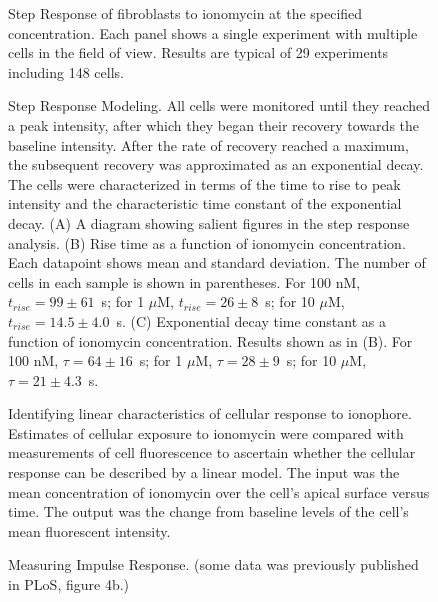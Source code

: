 \documentclass[letterpaper]{article}
\begin{document}
\begin{figure}
\centering

\caption{Step Response of fibroblasts to ionomycin at the specified
  concentration.  Each panel shows a single experiment with multiple cells
  in the field of view.  Results are typical of 29 experiments including
  148 cells. }
\end{figure}


\begin{figure}
\centering


\caption{Step Response Modeling.  All cells were monitored until they
  reached a peak intensity, after which they began their recovery towards
  the baseline intensity.  After the rate of recovery reached a maximum,
  the subsequent recovery was approximated as an exponential decay.  The
  cells were characterized in terms of the time to rise to peak intensity
  and the characteristic time constant of the exponential decay. (A) A
  diagram showing salient figures in the step response analysis.  (B) Rise
  time as a function of ionomycin concentration.  Each datapoint shows mean
  and standard deviation.  The number of cells in each sample is shown in
  parentheses.  For 100 nM, $t_{rise}=99\pm61$~s; for 1 $\mu$M,
  $t_{rise}=26\pm8$~s; for 10 $\mu$M, $t_{rise}=14.5\pm4.0$~s.  (C)
  Exponential decay time constant as a function of ionomycin concentration.
  Results shown as in (B).  For 100 nM, $\tau=64\pm16$~s; for 1 $\mu$M,
  $\tau=28\pm9$~s; for 10 $\mu$M, $\tau=21\pm4.3$~s.}
\end{figure}

\begin{figure}
\centering

\caption{Identifying linear characteristics of cellular response to
  ionophore.  Estimates of cellular exposure to ionomycin were compared
  with measurements of cell fluorescence to ascertain whether the cellular
  response can be described by a linear model.  The input was the mean
  concentration of ionomycin over the cell's apical surface versus time.
  The output was the change from baseline levels of the cell's mean
  fluorescent intensity.}
\end{figure}

\begin{figure}
\centering

\caption{Measuring Impulse Response.  (some data was previously published
  in PLoS, figure 4b.) }
\end{figure}
\end{document}
